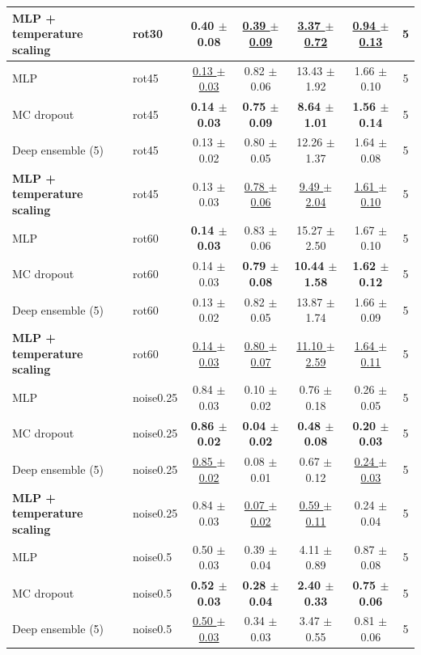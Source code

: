\begin{tabular}{llccccc}
\textbf{MLP + temperature scaling} & rot30 & 0.40 $\pm$ 0.08 & \underline{0.39 $\pm$ 0.09} & \underline{3.37 $\pm$ 0.72} & \underline{0.94 $\pm$ 0.13} & 5 \\
\midrule
MLP & rot45 & \underline{0.13 $\pm$ 0.03} & 0.82 $\pm$ 0.06 & 13.43 $\pm$ 1.92 & 1.66 $\pm$ 0.10 & 5 \\
MC dropout & rot45 & \textbf{0.14 $\pm$ 0.03} & \textbf{0.75 $\pm$ 0.09} & \textbf{8.64 $\pm$ 1.01} & \textbf{1.56 $\pm$ 0.14} & 5 \\
Deep ensemble (5) & rot45 & 0.13 $\pm$ 0.02 & 0.80 $\pm$ 0.05 & 12.26 $\pm$ 1.37 & 1.64 $\pm$ 0.08 & 5 \\
\textbf{MLP + temperature scaling} & rot45 & 0.13 $\pm$ 0.03 & \underline{0.78 $\pm$ 0.06} & \underline{9.49 $\pm$ 2.04} & \underline{1.61 $\pm$ 0.10} & 5 \\
\midrule
MLP & rot60 & \textbf{0.14 $\pm$ 0.03} & 0.83 $\pm$ 0.06 & 15.27 $\pm$ 2.50 & 1.67 $\pm$ 0.10 & 5 \\
MC dropout & rot60 & 0.14 $\pm$ 0.03 & \textbf{0.79 $\pm$ 0.08} & \textbf{10.44 $\pm$ 1.58} & \textbf{1.62 $\pm$ 0.12} & 5 \\
Deep ensemble (5) & rot60 & 0.13 $\pm$ 0.02 & 0.82 $\pm$ 0.05 & 13.87 $\pm$ 1.74 & 1.66 $\pm$ 0.09 & 5 \\
\textbf{MLP + temperature scaling} & rot60 & \underline{0.14 $\pm$ 0.03} & \underline{0.80 $\pm$ 0.07} & \underline{11.10 $\pm$ 2.59} & \underline{1.64 $\pm$ 0.11} & 5 \\
\midrule
MLP & noise0.25 & 0.84 $\pm$ 0.03 & 0.10 $\pm$ 0.02 & 0.76 $\pm$ 0.18 & 0.26 $\pm$ 0.05 & 5 \\
MC dropout & noise0.25 & \textbf{0.86 $\pm$ 0.02} & \textbf{0.04 $\pm$ 0.02} & \textbf{0.48 $\pm$ 0.08} & \textbf{0.20 $\pm$ 0.03} & 5 \\
Deep ensemble (5) & noise0.25 & \underline{0.85 $\pm$ 0.02} & 0.08 $\pm$ 0.01 & 0.67 $\pm$ 0.12 & \underline{0.24 $\pm$ 0.03} & 5 \\
\textbf{MLP + temperature scaling} & noise0.25 & 0.84 $\pm$ 0.03 & \underline{0.07 $\pm$ 0.02} & \underline{0.59 $\pm$ 0.11} & 0.24 $\pm$ 0.04 & 5 \\
\midrule
MLP & noise0.5 & 0.50 $\pm$ 0.03 & 0.39 $\pm$ 0.04 & 4.11 $\pm$ 0.89 & 0.87 $\pm$ 0.08 & 5 \\
MC dropout & noise0.5 & \textbf{0.52 $\pm$ 0.03} & \textbf{0.28 $\pm$ 0.04} & \textbf{2.40 $\pm$ 0.33} & \textbf{0.75 $\pm$ 0.06} & 5 \\
Deep ensemble (5) & noise0.5 & \underline{0.50 $\pm$ 0.03} & 0.34 $\pm$ 0.03 & 3.47 $\pm$ 0.55 & 0.81 $\pm$ 0.06 & 5 \\

\end{tabular}
